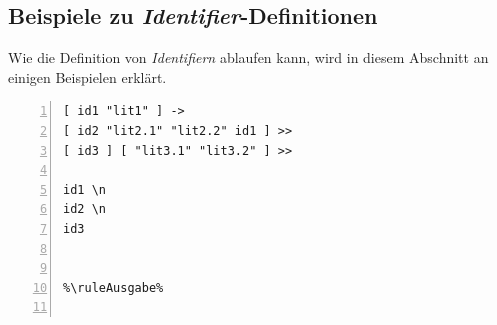 
\subsection{Beispiele zu \textit{Identifier}-Definitionen} \label{sec:howto-identifiers}
Wie die Definition von \textit{Identifiern} ablaufen kann, wird in diesem Abschnitt an einigen Beispielen erklärt.

\begin{minipage}{\linewidth}
\begin{multicols}{2}
\begin{lstlisting}[language=QHS, label=eg:howto_id1-3, caption=Beispiel zu gewöhnlichen \textit{Identifier}-Definitionen, numbers=left, stepnumber=1]
%\ruleEingabe%
[ id1 "lit1" ] ->
[ id2 "lit2.1" "lit2.2" id1 ] >>
[ id3 ] [ "lit3.1" "lit3.2" ] >>

id1 \n
id2 \n
id3


%\ruleAusgabe%


\end{lstlisting}
\end{multicols}
\end{minipage}
